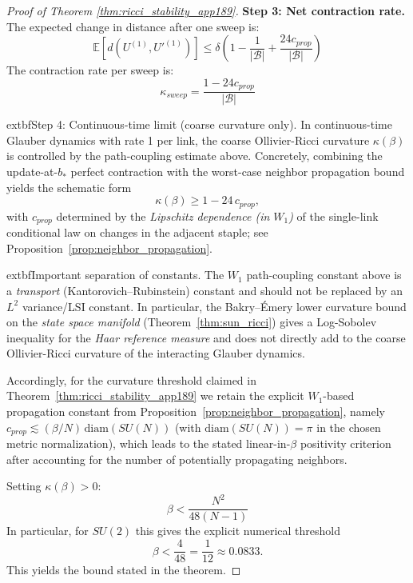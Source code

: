 \begin{proof}[Proof of Theorem \ref{thm:ricci_stability_app189}]
\textbf{Step 3: Net contraction rate.}
The expected change in distance after one sweep is:
\begin{equation}
    \mathbb{E}[d(U^{(1)}, U'^{(1)})] \leq \delta \left(1 - \frac{1}{|\mathcal{B}|} + \frac{24 c_{prop}}{|\mathcal{B}|}\right)
\end{equation}
The contraction rate per sweep is:
\begin{equation}
    \kappa_{sweep} = \frac{1 - 24 c_{prop}}{|\mathcal{B}|}
\end{equation}


    extbf{Step 4: Continuous-time limit (coarse curvature only).}
In continuous-time Glauber dynamics with rate 1 per link, the coarse Ollivier-Ricci curvature $\kappa(\beta)$ is controlled by the path-coupling estimate above. Concretely, combining the update-at-$b_*$ perfect contraction with the worst-case neighbor propagation bound yields the schematic form
\begin{equation}
    \kappa(\beta) \ge 1 - 24\,c_{prop},
\end{equation}
with $c_{prop}$ determined by the \emph{Lipschitz dependence (in $W_1$)} of the single-link conditional law on changes in the adjacent staple; see Proposition~\ref{prop:neighbor_propagation}.


    extbf{Important separation of constants.} The $W_1$ path-coupling constant above is a \emph{transport} (Kantorovich--Rubinstein) constant and should not be replaced by an $L^2$ variance/LSI constant. In particular, the Bakry--\'{E}mery lower curvature bound on the \emph{state space manifold} (Theorem~\ref{thm:sun_ricci}) gives a Log-Sobolev inequality for the \emph{Haar reference measure} and does not directly add to the coarse Ollivier-Ricci curvature of the interacting Glauber dynamics.

Accordingly, for the curvature threshold claimed in Theorem~\ref{thm:ricci_stability_app189} we retain the explicit $W_1$-based propagation constant from Proposition~\ref{prop:neighbor_propagation}, namely $c_{prop} \lesssim (\beta/N)\,\mathrm{diam}(SU(N))$ (with $\mathrm{diam}(SU(N))=\pi$ in the chosen metric normalization), which leads to the stated linear-in-$\beta$ positivity criterion after accounting for the number of potentially propagating neighbors.

Setting $\kappa(\beta) > 0$:
\begin{equation}
    \beta < \frac{N^2}{48(N-1)}
\end{equation}
In particular, for $SU(2)$ this gives the explicit numerical threshold
\[
\beta < \frac{4}{48} = \frac{1}{12} \approx 0.0833.
\]
This yields the bound stated in the theorem.
\end{proof}

